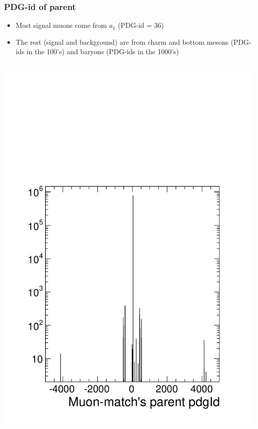 \documentclass[compress]{beamer}
\begin{document}
\begin{frame}
\frametitle{PDG-id of parent}

\begin{itemize}
\item Most signal muons come from $a_1$ (PDG-id = 36)
\item The rest (signal and background) are from charm and bottom
  mesons (PDG-ids in the 100's) and baryons (PDG-ids in the 1000's)
\end{itemize}

\begin{columns}
\includegraphics[width=\linewidth]{parents.pdf}

\end{columns}
\end{frame}
\end{document}
